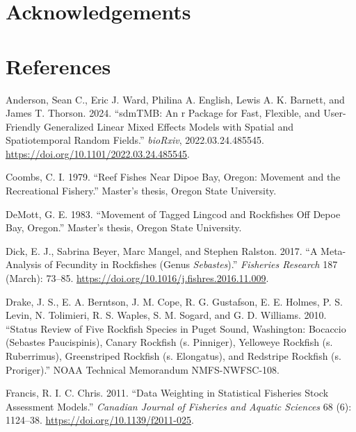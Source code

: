 \documentclass[
]{scrartcl}
\newlength{\cslhangindent}
\newenvironment{CSLReferences}[2] %
 {\begin{list}{}{%
  \setlength{\itemindent}{0pt}
  \setlength{\leftmargin}{0pt}
  \setlength{\parsep}{0pt}
  \ifodd #1
   \setlength{\leftmargin}{\cslhangindent}
   \setlength{\itemindent}{-1\cslhangindent}
  \fi
  \setlength{\itemsep}{#2\baselineskip}}}
 {\end{list}}
\begin{document}
\newpage{}

\section{Acknowledgements}\label{sec-acknowledgements}

\newpage{}

\section{References}\label{references}

\label{refs}
\begin{CSLReferences}{1}{0}
Anderson, Sean C., Eric J. Ward, Philina A. English, Lewis A. K.
Barnett, and James T. Thorson. 2024. {``sdmTMB: An r Package for Fast,
Flexible, and User-Friendly Generalized Linear Mixed Effects Models with
Spatial and Spatiotemporal Random Fields.''} \emph{bioRxiv},
2022.03.24.485545. \url{https://doi.org/10.1101/2022.03.24.485545}.

Coombs, C. I. 1979. {``Reef Fishes Near Dipoe Bay, Oregon: Movement and
the Recreational Fishery.''} Master's thesis, Oregon State University.

DeMott, G. E. 1983. {``Movement of Tagged Lingcod and Rockfishes Off
Depoe Bay, Oregon.''} Master's thesis, Oregon State University.

Dick, E. J., Sabrina Beyer, Marc Mangel, and Stephen Ralston. 2017. {``A
Meta-Analysis of Fecundity in Rockfishes (Genus \emph{Sebastes}).''}
\emph{Fisheries Research} 187 (March): 73--85.
\url{https://doi.org/10.1016/j.fishres.2016.11.009}.

Drake, J. S., E. A. Berntson, J. M. Cope, R. G. Gustafson, E. E. Holmes,
P. S. Levin, N. Tolimieri, R. S. Waples, S. M. Sogard, and G. D.
Williams. 2010. {``Status Review of Five Rockfish Species in Puget
Sound, Washington: Bocaccio (Sebastes Paucispinis), Canary Rockfish (s.
Pinniger), Yelloweye Rockfish (s. Ruberrimus), Greenstriped Rockfish (s.
Elongatus), and Redstripe Rockfish (s. Proriger).''} NOAA Technical
Memorandum NMFS-NWFSC-108.

Francis, R. I. C. Chris. 2011. {``Data Weighting in Statistical
Fisheries Stock Assessment Models.''} \emph{Canadian Journal of
Fisheries and Aquatic Sciences} 68 (6): 1124--38.
\url{https://doi.org/10.1139/f2011-025}.


\end{CSLReferences}
\end{document}
